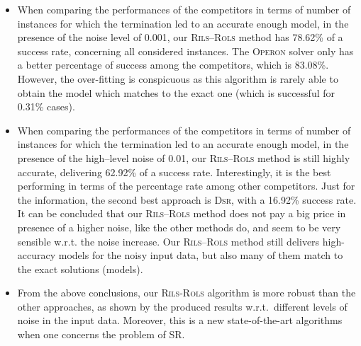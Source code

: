 \documentclass[a4paper,12pt]{elsarticle}
\begin{document}
\begin{itemize}
   \item  When comparing the performances of the competitors in terms of number of instances for which the  termination led to an accurate enough model, in the presence of the noise level of 0.001, our \textsc{Rils}--\textsc{Rols} method has 78.62\% of a success rate, concerning all considered instances.  The \textsc{Operon} solver only has a better percentage of success among the competitors, which is 83.08\%. However, the over-fitting is conspicuous as this algorithm is rarely able to obtain the model which matches to the exact one (which is successful for 0.31\% cases). 
   
   \item   When comparing the performances of the competitors in terms of number of instances for which the  termination led to an accurate enough model, in the presence of the high--level noise of 0.01, our \textsc{Rils}--\textsc{Rols} method is still highly accurate, delivering  62.92\% of a success rate. Interestingly, it is the best performing in terms of the percentage rate among other competitors. Just for the information, the second best approach is \textsc{Dsr}, with a 16.92\% success rate. It can be concluded that our \textsc{Rils}--\textsc{Rols} method does not pay a big price in presence of a higher noise, like the other methods do, and seem to be very sensible w.r.t. the noise increase. Our \textsc{Rils}--\textsc{Rols} method still delivers high-accuracy models for the noisy input data, but also many of them match to the exact solutions (models).
   
   \item From the above conclusions, our \textsc{Rils}-\textsc{Rols} algorithm is more robust than the other approaches, as shown by the produced results w.r.t.\ different levels of noise in the input data. Moreover, this is a new state-of-the-art algorithms when one concerns the problem of SR.
   
   
\end{itemize}


 
\end{document}
